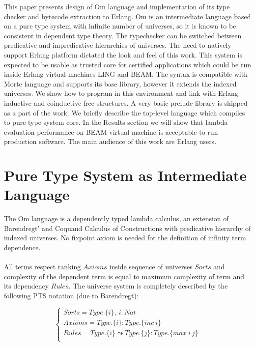 \documentclass[11pt,oneside]{article}
\begin{document}
This paper presents design of Om language and implementation of its type checker 
and bytecode extraction to Erlang. Om is an intermediate language
based on a pure type system with infinite
number of universes, so it is known to be consistent in dependent type theory.
The typechecker can be switched between predicative and impredicative hierarchies
of universes. The need to natively support Erlang platform dictated the look and feel of this work.
This system is expected to be usable as trusted core for certified
applications which could be run inside Erlang virtual machines LING and BEAM.
The syntax is compatible with Morte language and supports its base
library, however it extends the indexed universes.
We show how to program in this environment and link with Erlang
inductive and coinductive free structures. A very basic prelude library is shipped
as a part of the work. We briefly describe the top-level
language which compiles to pure type system core. In the Results section we will
show that lambda evaluation performance on BEAM virtual machine is acceptable to run
production software. The main audience of this work are Erlang users.

\section{Pure Type System as Intermediate Language}

\paragraph{}
The Om language is a dependently typed lambda calculus, an extension of Barendregt'
and Coquand Calculus of Constructions with predicative hierarchy of indexed universes.
No fixpoint axiom is needed for the definition of infinity term dependence.

\paragraph{}
All terms respect ranking $Axioms$ inside sequence of universes $Sorts$ and complexity of the
dependent term is equal to maximum complexity of term and its dependency $Rules$. The universe
system is completely described by the following PTS notation (due to Barendregt):

$$
\begin{cases}
Sorts = Type.\{i\},\ i : Nat\\
Axioms = Type.\{i\} : Type.\{inc\ i\}\\
Rules = Type.\{i\} \leadsto Type.\{j\} : Type.\{max\ i\ j\}\\
\end{cases}
$$
\end{document}
